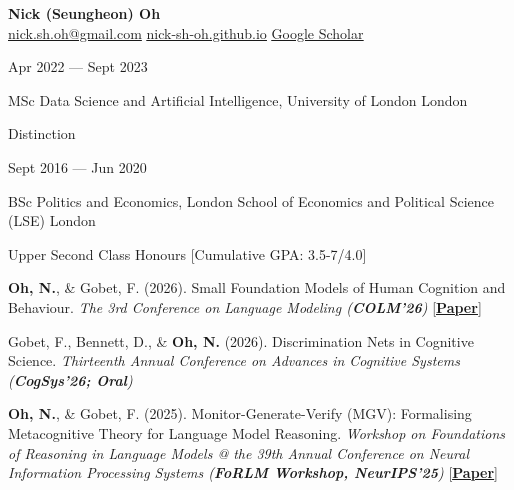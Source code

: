\documentclass[10pt]{article}
\newlength{\labelw}\setlength{\labelw}{123pt}
\newlength{\colgap}\setlength{\colgap}{3pt}
\newlength{\contentw}\setlength{\contentw}{381pt}
\newcommand{\bodysize}{\fontsize{9}{11.25}\selectfont}
\newcommand{\lblfont}{\fontsize{7.5}{9.5}\selectfont}
\newcommand{\titlefont}{\fontsize{11}{13.2}\selectfont}
\newcommand{\lbl}[1]{{\lblfont\textls[90]{#1}}}
\newcommand{\ilink}[2]{\href{#1}{\textcolor{linkblue}{\uline{#2}}}}  %
\newcommand{\plink}[2]{[\href{#1}{\textcolor{linkblue}{\uline{\textbf{#2}}}}]} %
\newcommand{\secrule}{\par\needspace{48pt}\vspace{11pt}\noindent{\color{textcol}\rule{\textwidth}{0.75pt}}\par\vspace{10pt}\nopagebreak}
\newcommand{\lblrow}[1]{\noindent\lbl{#1}\par\nopagebreak\vspace{8pt}}
\newcommand{\cvrow}[2]{\noindent\begin{minipage}[t]{\labelw}\raggedright\lbl{#1}\end{minipage}\hspace{\colgap}%
\begin{minipage}[t]{\contentw}#2\end{minipage}\par}
\newcommand{\daterow}[2]{\noindent\begin{minipage}[t]{\labelw}\raggedright #1\end{minipage}\hspace{\colgap}%
\begin{minipage}[t]{\contentw}#2\end{minipage}\par}
\newcommand{\controw}[1]{\vspace{10pt}\noindent\hspace{\labelw}\hspace{\colgap}%
\begin{minipage}[t]{\contentw}#1\end{minipage}\par}
\newcommand{\entry}[2]{{\titlefont #1}\nolinebreak[1]\hspace*{\fill} {\bodysize #2}}
\newcommand{\entrysep}{\vspace{10pt}}
\begin{document}
\color{textcol}\bodysize

\begin{center}
{\fontsize{14}{16.8}\selectfont\bfseries Nick (Seungheon) Oh}\\[6pt]
{\bodysize\href{mailto:nick.sh.oh@gmail.com}{\textcolor{textcol}{nick.sh.oh@gmail.com}} \quad\textperiodcentered\quad \ilink{https://nick-sh-oh.github.io}{nick-sh-oh.github.io} \quad\textperiodcentered\quad \ilink{https://scholar.google.com/citations?user=L0tpB4EAAAAJ}{Google Scholar}}
\end{center}

\secrule
\lblrow{EDUCATION}
\daterow{Apr 2022 --- Sept 2023}{%
\entry{MSc Data Science and Artificial Intelligence, University of London}{London}\par\vspace{3pt}
Distinction}
\entrysep
\daterow{Sept 2016 --- Jun 2020}{%
\entry{BSc Politics and Economics, London School of Economics and Political Science (LSE)}{London}\par\vspace{3pt}
Upper Second Class Honours [Cumulative GPA: 3.5-7/4.0]}

\secrule
\cvrow{SELECTED\\PUBLICATIONS}{%
\textbf{Oh, N.}, \& Gobet, F. (2026). Small Foundation Models of Human Cognition and Behaviour. \textit{The 3rd Conference on Language Modeling (\textbf{COLM'26})} \plink{https://arxiv.org/abs/2608.05224}{Paper}}
\controw{%
Gobet, F., Bennett, D., \& \textbf{Oh, N.} (2026). Discrimination Nets in Cognitive Science. \textit{Thirteenth Annual Conference on Advances in Cognitive Systems (\textbf{CogSys'26; Oral})}}
\controw{%
\textbf{Oh, N.}, \& Gobet, F. (2025). Monitor-Generate-Verify (MGV): Formalising Metacognitive Theory for Language Model Reasoning. \textit{Workshop on Foundations of Reasoning in Language Models @ the 39th Annual Conference on Neural Information Processing Systems (\textbf{FoRLM Workshop, NeurIPS'25})} \plink{https://arxiv.org/abs/2511.04341}{Paper}}
\end{document}
